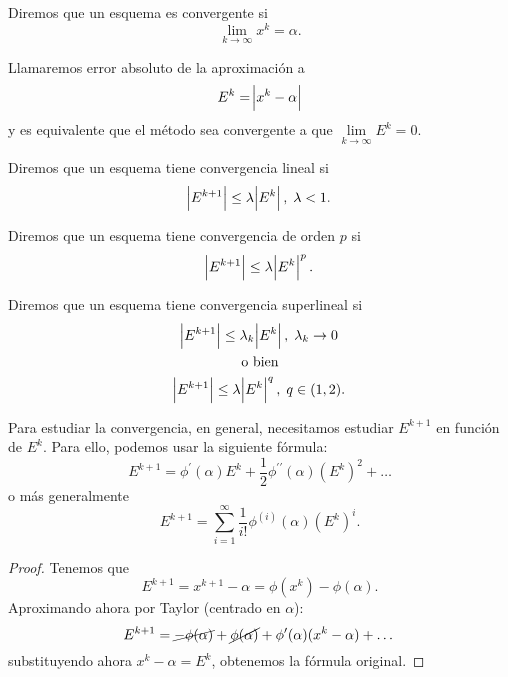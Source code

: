 \begin{defi}
    Diremos que un esquema es convergente si
    \[
        \lim_{k \to \infty} x^k = \alpha.
    \]
\end{defi}

\begin{defi}
    Llamaremos error absoluto de la aproximación a 
    \[
        E^k = \abs{x^k - \alpha}
    \]
    y es equivalente que el método sea convergente a que $\lim\limits_{k \to \infty} E^k = 0$.
\end{defi}

\begin{defi}
    Diremos que un esquema tiene convergencia lineal si
    \[
        \abs{E^{k+1}} \leq \lambda \abs{E^k}, \; \lambda < 1.
    \]
\end{defi}

\begin{defi}
    Diremos que un esquema tiene convergencia de orden $p$ si
    \[
        \abs{E^{k+1}} \leq \lambda \abs{E^k}^p.
    \]
\end{defi}

\begin{defi}
    Diremos que un esquema tiene convergencia superlineal si
    \begin{gather*}
        \abs{E^{k+1}} \leq \lambda_k \abs{E^k}, \; \lambda_k \to 0 \\
        \text{o bien} \\
        \abs{E^{k+1}} \leq \lambda \abs{E^k}^q, \; q \in (1, 2).
    \end{gather*}
\end{defi}

\begin{prop}
    Para estudiar la convergencia, en general, necesitamos estudiar $E^{k+1}$ en función de $E^k$.
    Para ello, podemos usar la siguiente fórmula:
    \[
        E^{k+1} = \phi^\prime(\alpha)E^k + \frac{1}{2} \phi^{\prime \prime}(\alpha)\left( E^k \right)^2 + \dots
    \]
    o más generalmente
    \[
        E^{k+1} = \sum^{\infty}_{i = 1} \frac{1}{i!} \phi^{(i)}(\alpha) \left( E^k \right)^i.
    \]
\end{prop}

\begin{proof}
    Tenemos que
    \[
        E^{k+1} = x^{k+1} - \alpha = \phi(x^k) - \phi(\alpha).
    \]
    Aproximando ahora por Taylor (centrado en $\alpha$):
    \[
        E^{k+1} = \cancel{-\phi(\alpha)} + \cancel{\phi(\alpha)} + \phi^\prime(\alpha)(x^k - \alpha) + \dots
    \]
    substituyendo ahora $x^k - \alpha = E^k$, obtenemos la fórmula original.
\end{proof}

